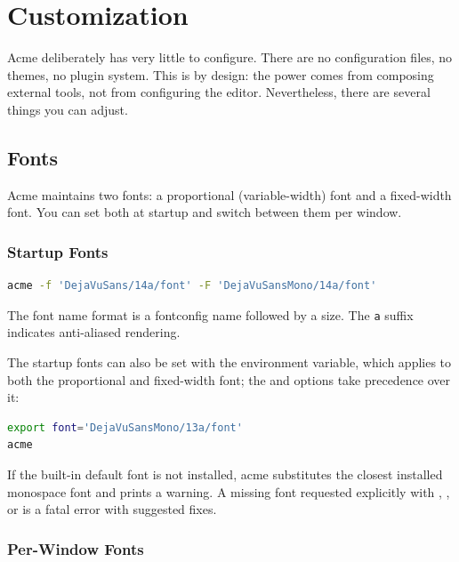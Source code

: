 \chapter{Customization}
\label{ch:customize}


Acme deliberately has very little to configure.  There are no
configuration files, no themes, no plugin system.  This is by design:
the power comes from composing external tools, not from configuring the
editor.  Nevertheless, there are several things you can adjust.

\section{Fonts}
\label{sec:fonts}


Acme maintains two fonts: a proportional (variable-width) font and a
fixed-width font.  You can set both at startup and switch between them
per window.

\subsection{Startup Fonts}

\begin{lstlisting}[language=bash]
acme -f 'DejaVuSans/14a/font' -F 'DejaVuSansMono/14a/font'
\end{lstlisting}

The font name format is a fontconfig name followed by a size.  The
\texttt{a} suffix indicates anti-aliased rendering.

The startup fonts can also be set with the  environment
variable, which applies to both the proportional and fixed-width
font; the  and  options take precedence over it:

\begin{lstlisting}[language=bash]
export font='DejaVuSansMono/13a/font'
acme
\end{lstlisting}

If the built-in default font is not installed, acme substitutes the
closest installed monospace font and prints a warning.  A missing
font requested explicitly with , , or  is a
fatal error with suggested fixes.

\subsection{Per-Window Fonts}


